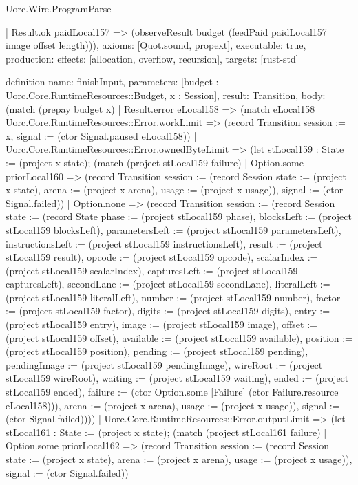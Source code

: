 \begin{lexlean}{Uorc.Wire.ProgramParse}
\begin{semanticmodule}
{    | Result.ok paidLocal157 => (observeResult budget (feedPaid paidLocal157 image offset length))),
  axioms: [Quot.sound, propext],
  executable: true,
  production: {effects: [allocation, overflow, recursion], targets: [rust-std]}
}

definition{
  name: finishInput,
  parameters: [budget : Uorc.Core.RuntimeResources::Budget, x : Session],
  result: Transition,
  body: (match (prepay budget x)
    | Result.error eLocal158 => (match eLocal158
      | Uorc.Core.RuntimeResources::Error.workLimit => (record Transition {session := x, signal := (ctor Signal.paused eLocal158)})
      | Uorc.Core.RuntimeResources::Error.ownedByteLimit => (let stLocal159 : State := (project x state); (match (project stLocal159 failure)
        | Option.some priorLocal160 => (record Transition {session := (record Session {state := (project x state), arena := (project x arena), usage := (project x usage)}), signal := (ctor Signal.failed)})
        | Option.none => (record Transition {session := (record Session {state := (record State {phase := (project stLocal159 phase), blocksLeft := (project stLocal159 blocksLeft), parametersLeft := (project stLocal159 parametersLeft), instructionsLeft := (project stLocal159 instructionsLeft), result := (project stLocal159 result), opcode := (project stLocal159 opcode), scalarIndex := (project stLocal159 scalarIndex), capturesLeft := (project stLocal159 capturesLeft), secondLane := (project stLocal159 secondLane), literalLeft := (project stLocal159 literalLeft), number := (project stLocal159 number), factor := (project stLocal159 factor), digits := (project stLocal159 digits), entry := (project stLocal159 entry), image := (project stLocal159 image), offset := (project stLocal159 offset), available := (project stLocal159 available), position := (project stLocal159 position), pending := (project stLocal159 pending), pendingImage := (project stLocal159 pendingImage), wireRoot := (project stLocal159 wireRoot), waiting := (project stLocal159 waiting), ended := (project stLocal159 ended), failure := (ctor Option.some [Failure] (ctor Failure.resource eLocal158))}), arena := (project x arena), usage := (project x usage)}), signal := (ctor Signal.failed)})))
      | Uorc.Core.RuntimeResources::Error.outputLimit => (let stLocal161 : State := (project x state); (match (project stLocal161 failure)
        | Option.some priorLocal162 => (record Transition {session := (record Session {state := (project x state), arena := (project x arena), usage := (project x usage)}), signal := (ctor Signal.failed)})
}
\end{semanticmodule}
\end{lexlean}
